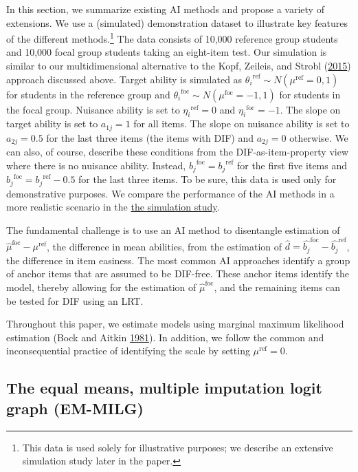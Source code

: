 \documentclass[
  11pt,
]{article}
\begin{document}
In this section, we summarize existing AI methods and propose a variety of extensions. We use a (simulated) demonstration dataset to illustrate key features of the different methods.\footnote{This data is used solely for illustrative purposes; we describe an extensive simulation study later in the paper.} The data consists of 10,000 reference group students and 10,000 focal group students taking an eight-item test. Our simulation is similar to our multidimensional alternative to the Kopf, Zeileis, and Strobl (\protect\hyperlink{ref-kopf2015framework}{2015}) approach discussed above. Target ability is simulated as \({\theta_i}^{\text{ref}} \sim N(\mu^\text{ref} = 0,1)\) for students in the reference group and \({\theta_i}^{\text{foc}} \sim N(\mu^\text{foc} = -1,1)\) for students in the focal group. Nuisance ability is set to \({\eta_i}^{\text{ref}} = 0\) and \({\eta_i}^{\text{foc}} = -1\). The slope on target ability is set to \(a_{1j} = 1\) for all items. The slope on nuisance ability is set to \(a_{2j} = 0.5\) for the last three items (the items with DIF) and \(a_{2j} = 0\) otherwise. We can also, of course, describe these conditions from the DIF-as-item-property view where there is no nuisance ability. Instead, \({b_j}^{\text{foc}} = {b_j}^{\text{ref}}\) for the first five items and \({b_j}^{\text{foc}} = {b_j}^{\text{ref}} - 0.5\) for the last three items. To be sure, this data is used only for demonstrative purposes. We compare the performance of the AI methods in a more realistic scenario in the \protect\hyperlink{simstudy}{the simulation study}.

The fundamental challenge is to use an AI method to disentangle estimation of \(\hat\mu^\text{foc} - \mu^\text{ref}\), the difference in mean abilities, from the estimation of \(\hat d = \hat{b_j}^{\text{foc}} - \hat{b_j}^{\text{ref}}\), the difference in item easiness. The most common AI approaches identify a group of anchor items that are assumed to be DIF-free. These anchor items identify the model, thereby allowing for the estimation of \(\hat\mu^\text{foc}\), and the remaining items can be tested for DIF using an LRT.

Throughout this paper, we estimate models using marginal maximum likelihood estimation (Bock and Aitkin \protect\hyperlink{ref-bock1981marginal}{1981}). In addition, we follow the common and inconsequential practice of identifying the scale by setting \(\mu^\text{ref} = 0\).

\hypertarget{emmilg}{%
\subsection{The equal means, multiple imputation logit graph (EM-MILG)}\label{emmilg}}
\end{document}
